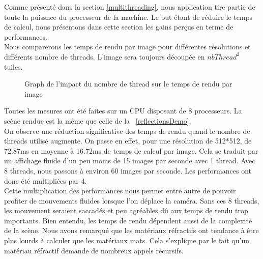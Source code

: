 \documentclass[../../Rapport RayTracer]{subfiles}
\begin{document}
Comme présenté dans la section \ref{multithreading}, nous application tire partie de toute la puissnce du processeur de la machine. Le but étant de réduire le temps de calcul, nous présentons dans cette section les gains perçus en terme de performances.\\
Nous comparerons les temps de rendu par image pour différentes résolutions et différents nombre de threads. L'image sera toujours découpée en $nbThread^2$ tuiles.

\begin{figure}[h!]
	
	\caption{Graph de l'impact du nombre de thread sur le temps de rendu par image}
	\label{graphMultithreading}
\end{figure}
\FloatBarrier
Toutes les mesures ont été faites sur un CPU disposant de 8 processeurs. La scène rendue est la même que celle de la \figurename\ \ref{reflectionsDemo}.\\
On observe une réduction significative des temps de rendu quand le nombre de threads utilisé augmente. On passe en effet, pour une résolution de 512*512, de 72.87ms en moyenne à 16.72ms de temps de calcul par image. Cela se traduit par un affichage fluide d'un peu moins de 15 images par seconde avec 1 thread. Avec 8 threads, nous passons à environ 60 images par seconde. Les performances ont donc été multipliées par 4.\\
Cette multiplication des performances nous permet entre autre de pouvoir profiter de mouvements fluides lorsque l'on déplace la caméra. Sans ces 8 threads, les mouvement seraient saccadés et peu agréables dû aux temps de rendu trop importants. Bien entendu, les temps de rendu dépendent aussi de la complexité de la scène. Nous avons remarqué que les matériaux réfractifs ont tendance à être plus lourds à calculer que les matériaux mats. Cela s'explique par le fait qu'un matériau réfractif demande de nombreux appels récursifs.
\end{document}
